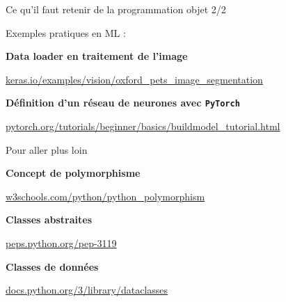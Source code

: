 \documentclass[10pt]{beamer}
\begin{document}
\begin{frame}{Ce qu'il faut retenir de la programmation objet 2/2}

  Exemples pratiques en ML :
  
  \bigskip
  
  \textbf{Data loader en traitement de l'image}

    \href{https://keras.io/examples/vision/oxford_pets_image_segmentation/}{keras.io/examples/vision/oxford\_pets\_image\_segmentation}

  \bigskip

  \textbf{Définition d'un réseau de neurones avec \texttt{PyTorch}}
    
  \href{https://pytorch.org/tutorials/beginner/basics/buildmodel_tutorial.html}{pytorch.org/tutorials/beginner/basics/buildmodel\_tutorial.html}

  \end{frame}


\begin{frame}{Pour aller plus loin}

  \textbf{Concept de polymorphisme}
  
  \href{https://www.w3schools.com/python/python\_polymorphism.asp}{w3schools.com/python/python\_polymorphism}
  
  \medskip

  \textbf{Classes abstraites}
  
  \href{https://peps.python.org/pep-3119/}{peps.python.org/pep-3119}

  \medskip  

  \textbf{Classes de données}
  
  \href{https://docs.python.org/3/library/dataclasses.html}{docs.python.org/3/library/dataclasses}
\end{frame}
\end{document}
